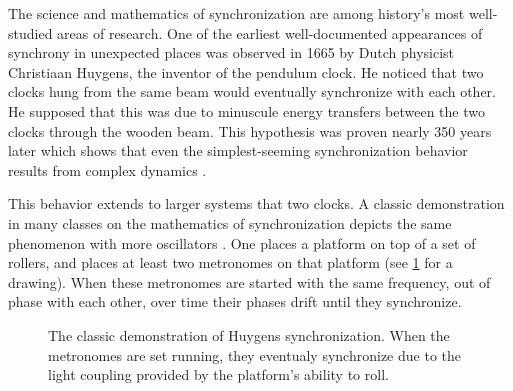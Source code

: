 The science and mathematics of synchronization are among history's most well-studied areas of research.
One of the earliest well-documented appearances of synchrony in unexpected places was observed in 1665 by Dutch physicist Christiaan Huygens, the inventor of the pendulum clock.
He noticed that two clocks hung from the same beam would eventually synchronize with each other.
He supposed that this was due to minuscule energy transfers between the two clocks through the wooden beam.
This hypothesis was proven nearly 350 years later which shows that even the simplest-seeming synchronization behavior results from complex dynamics \cite{PenaRamirez2016}.

This behavior extends to larger systems that two clocks.
A classic demonstration in many classes on the mathematics of synchronization depicts the same phenomenon with more oscillators \cite{Pantaleone2002}.
One places a platform on top of a set of rollers, and places at least two metronomes on that platform (see \cref{fig:metronome_demo} for a drawing).
When these metronomes are started with the same frequency, out of phase with each other, over time their phases drift until they synchronize.
\begin{figure}[ht]
  \centering
  \caption[Synchronization demonstration]{The classic demonstration of Huygens synchronization.  When the metronomes are set running, they eventualy synchronize due to the light coupling provided by the platform's ability to roll.}
  \label{fig:metronome_demo}
\end{figure}

